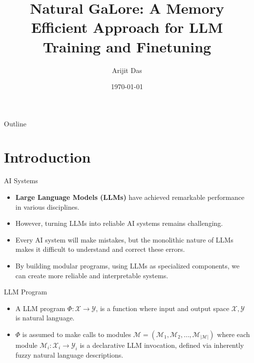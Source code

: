 \documentclass{beamer}
\title{Natural GaLore: A Memory Efficient Approach for LLM Training and Finetuning}
\author{Arijit Das}
\date{\today}
\begin{document}
\begin{frame}
    \titlepage
\end{frame}

\begin{frame}{Outline}
    \tableofcontents
\end{frame}

\section{Introduction}

\begin{frame}{AI Systems}
    \begin{itemize}
        \item \textbf{Large Language Models (LLMs)} have achieved remarkable performance in various disciplines.
        \item However, turning LLMs into reliable AI systems remains challenging.
        \item Every AI system will make mistakes, but the monolithic nature of LLMs makes it difficult to understand and correct these errors.
        \item By building modular programs, using LLMs as specialized components, we can create more reliable and interpretable systems.
    \end{itemize}
\end{frame}

\begin{frame}{LLM Program}
    \begin{itemize}
        \item A LLM program \(\Phi: \mathcal{X} \to \mathcal{Y}\), is a function where input and output space \(\mathcal{X}, \mathcal{Y}\) is natural language.
        \item \(\Phi\) is assumed to make calls to modules \(\mathcal{M} = \left(\mathcal{M}_1, \mathcal{M}_2, \ldots, \mathcal{M}_{|\mathcal{M}|}\right)\) where each module \(\mathcal{M}_i: \mathcal{X}_i \to \mathcal{Y}_i\) is a declarative LLM invocation, defined via inherently fuzzy natural language descriptions.
    \end{itemize}
\end{frame}
\end{document}
